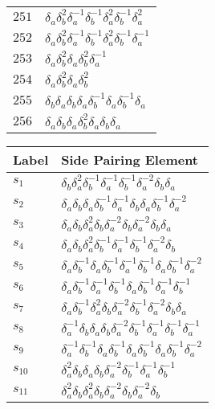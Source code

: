 \documentclass{article}
\begin{document}
\begin{center}
\begin{tabular}{ll}
$251$ & $\delta_a^{}\delta_b^{2}\delta_a^{-1}\delta_b^{-1}\delta_a^{2}\delta_b^{-1}\delta_a^{2}$ \\
$252$ & $\delta_a^{}\delta_b^{2}\delta_a^{-1}\delta_b^{-1}\delta_a^{2}\delta_b^{-1}\delta_a^{-1}$ \\
$253$ & $\delta_a^{}\delta_b^{2}\delta_a^{}\delta_b^{2}\delta_a^{-1}$ \\
$254$ & $\delta_a^{}\delta_b^{2}\delta_a^{}\delta_b^{2}$ \\
$255$ & $\delta_b^{}\delta_a^{}\delta_b^{}\delta_a^{}\delta_b^{-1}\delta_a^{}\delta_b^{-1}\delta_a^{}$ \\
$256$ & $\delta_a^{}\delta_b^{}\delta_a^{}\delta_b^{2}\delta_a^{}\delta_b^{}\delta_a^{}$ \\
\bottomrule
\end{tabular}
\hfill
\begin{tabular}{ll}
\toprule
Label & Side Pairing Element\\
\midrule
$s_{1}$ & $\delta_b^{}\delta_a^{2}\delta_b^{-1}\delta_a^{-1}\delta_b^{-1}\delta_a^{-2}\delta_b^{}\delta_a^{}$ \\
$s_{2}$ & $\delta_a^{}\delta_b^{}\delta_a^{}\delta_b^{-1}\delta_a^{-1}\delta_b^{}\delta_a^{}\delta_b^{-1}\delta_a^{-2}$ \\
$s_{3}$ & $\delta_a^{}\delta_b^{}\delta_a^{2}\delta_b^{}\delta_a^{-2}\delta_b^{}\delta_a^{-2}\delta_b^{}\delta_a^{}$ \\
$s_{4}$ & $\delta_a^{}\delta_b^{}\delta_a^{2}\delta_b^{-1}\delta_a^{-1}\delta_b^{-1}\delta_a^{-2}\delta_b^{}$ \\
$s_{5}$ & $\delta_a^{}\delta_b^{-1}\delta_a^{}\delta_b^{-1}\delta_a^{-1}\delta_b^{-1}\delta_a^{}\delta_b^{-1}\delta_a^{-2}$ \\
$s_{6}$ & $\delta_a^{}\delta_b^{-1}\delta_a^{-1}\delta_b^{-1}\delta_a^{}\delta_b^{-1}\delta_a^{-1}\delta_b^{-1}$ \\
$s_{7}$ & $\delta_a^{}\delta_b^{-1}\delta_a^{2}\delta_b^{}\delta_a^{-2}\delta_b^{-1}\delta_a^{-2}\delta_b^{}\delta_a^{}$ \\
$s_{8}$ & $\delta_a^{-1}\delta_b^{}\delta_a^{}\delta_b^{}\delta_a^{-2}\delta_b^{-1}\delta_a^{-1}\delta_b^{-1}\delta_a^{-1}$ \\
$s_{9}$ & $\delta_a^{-1}\delta_b^{-1}\delta_a^{}\delta_b^{-1}\delta_a^{}\delta_b^{-1}\delta_a^{}\delta_b^{-1}\delta_a^{-2}$ \\
$s_{10}$ & $\delta_a^{2}\delta_b^{}\delta_a^{}\delta_b^{}\delta_a^{-2}\delta_b^{-1}\delta_a^{-1}\delta_b^{-1}$ \\
$s_{11}$ & $\delta_a^{2}\delta_b^{}\delta_a^{2}\delta_b^{}\delta_a^{-2}\delta_b^{}\delta_a^{-2}\delta_b^{}$ \\

\end{tabular}
\end{center}
\end{document}
